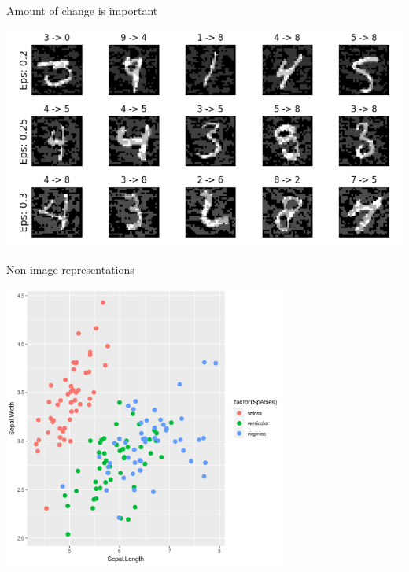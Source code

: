 \documentclass[smaller]{beamer}
\begin{document}
\begin{frame}[label={sec:org0350166}]{Amount of change is important}
\begin{center}
\includegraphics[width=.9\linewidth]{images/eos.png}
\end{center}
\end{frame}

\begin{frame}[label={sec:org3795342}]{Non-image representations}
\begin{center}
\includegraphics[width=0.7\textwidth]{images/iris.png}
\end{center}
\end{frame}
\end{document}
